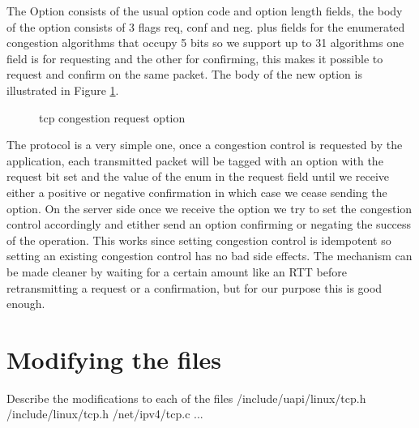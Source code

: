\documentclass[type=bsc,accentcolor=tud9a,colorback,11pt,paper=a4report]{tudthesis}
\begin{document}
The Option consists of the usual option code and option length fields, 
the body of the 
option consists of 3 flags req, conf and neg. plus fields for the enumerated 
congestion algorithms that occupy 5 bits so we support up to 31 algorithms one 
field is for 
requesting and the other for confirming, this makes it possible to request and 
confirm on the same packet. The body of the new option is illustrated in Figure
\ref{fig:option}.

\begin{figure}[h]
\centering
{}
\caption{tcp congestion request option}
\label{fig:option}
\end{figure}

The protocol is a very simple one, once a congestion control is requested by the
application, each transmitted packet will be tagged with an option with the 
request bit set and the value of the enum in the request field until we
receive either a positive or negative confirmation in which case we
cease sending the option. On the server side once we receive the option
we try to set the congestion control accordingly and etither send an
option confirming or negating the success of the operation. This works
since setting congestion control is idempotent so setting an existing
congestion control has no bad side effects. The mechanism can be made
cleaner by waiting for a certain amount like an RTT before retransmitting 
a request or a confirmation, but for our purpose this is good enough.
	\section{Modifying the files}
		Describe the modifications to each of the files
		/include/uapi/linux/tcp.h /include/linux/tcp.h /net/ipv4/tcp.c ...
\end{document}
